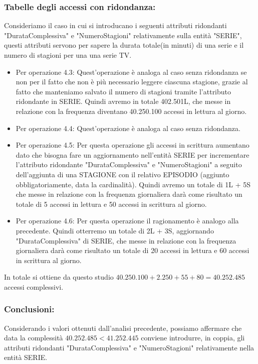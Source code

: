 \documentclass[a4paper,12pt]{report}
\begin{document}
\subsubsection{Tabelle degli accessi con ridondanza:}
Consideriamo il caso in cui si introducano i seguenti attributi ridondanti "DurataComplessiva" e "NumeroStagioni" relativamente sulla entità "SERIE", questi attributi servono per sapere la durata totale(in minuti) di una serie e il numero di stagioni per una una serie TV.
\begin{itemize}
	\item Per operazione 4.3: Quest'operazione è analoga al caso senza ridondanza se non per il fatto che non è più necessario leggere ciascuna stagione, grazie al fatto che manteniamo salvato il numero di stagioni tramite l'attributo ridondante in SERIE. Quindi avremo in totale 402.501L, che messe in relazione con la frequenza diventano 40.250.100 accessi in lettura al giorno.
	\item Per operazione 4.4: Quest'operazione è analoga al caso senza ridondanza.
	\item Per operazione 4.5: Per questa operazione gli accessi in scrittura aumentano dato che bisogna fare un aggiornamento nell'entità SERIE per incrementare l'attributo ridondante "DurataComplessiva" e "NumeroStagioni" a seguito dell'aggiunta di una STAGIONE con il relativo EPISODIO (aggiunto obbligatoriamente, data la cardinalità). 
	Quindi avremo un totale di 1L + 5S che messe in relazione con la frequenza giornaliera darà come risultato un totale di 5 accessi in lettura e 50 accessi in scrittura al giorno.
	\item Per operazione 4.6: Per questa operazione il ragionamento è analogo alla precedente. Quindi otterremo un totale di 2L + 3S, aggiornando "DurataComplessiva" di SERIE, che messe in relazione con la frequenza giornaliera darà come risultato un totale di 20 accessi in lettura e 60 accessi in scrittura al giorno.
\end{itemize}

In totale si ottiene da questo studio $40.250.100 + 2.250 + 55 + 80 = 40.252.485$ accessi complessivi.
\subsubsection{Conclusioni:}
Considerando i valori ottenuti dall'analisi precedente, possiamo affermare che data la complessità $40.252.485 < 41.252.445$ conviene introdurre, in coppia, gli attributi ridondanti "DurataComplessiva" e "NumeroStagioni" relativamente nella entità SERIE.
\end{document}
